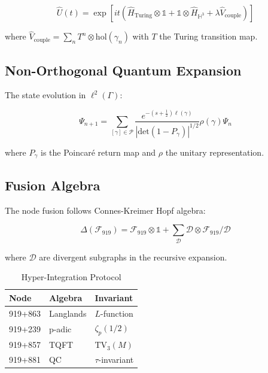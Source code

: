 \documentclass[12pt]{article}
\begin{document}
\begin{equation}
\hat{U}(t) = \exp\left[it\left(\hat{H}_{\text{Turing}} \otimes \mathbb{1} + \mathbb{1} \otimes \hat{H}_{\mathbb{H}^3} + \lambda \hat{V}_{\text{couple}}\right)\right]
\end{equation}

where $\hat{V}_{\text{couple}} = \sum_n T^n \otimes \text{hol}(\gamma_n)$ with $T$ the Turing transition map.

\subsection{Non-Orthogonal Quantum Expansion}
The state evolution in $\ell^2(\Gamma)$:

\begin{equation}
\Psi_{n+1} = \sum_{[\gamma]\in\mathcal{P}} \frac{e^{-(s+\frac{1}{2})\ell(\gamma)}}{|\text{det}(1-P_\gamma)|^{1/2}} \rho(\gamma)\Psi_n
\end{equation}

where $P_\gamma$ is the Poincaré return map and $\rho$ the unitary representation.

\begin{algorithm}[H]
\caption{Recursive Entropy Modulation}
\begin{algorithmic}[1]
\STATE Initialize $\Psi_0$ with $S_0 = \log\dim\mathcal{H}_\Gamma$
$}
\STATE Compute $\Delta S_n = \| \text{tr}_{\partial\mathbb{H}^3}(\Psi_n^\dagger\Psi_n) \|_1$
\STATE Update $S_{n+1} = S_n e^{-\alpha t} + \beta \Delta S_n$
\STATE Apply $U_{\text{Hopf}}(t) = \exp\left[it \int_{S^1} \eta^*\nabla \right]$
\ENDFOR
\end{algorithmic}
\end{algorithm}

\subsection{Fusion Algebra}
The node fusion follows Connes-Kreimer Hopf algebra:

\begin{equation}
\Delta(\mathcal{F}_{919}) = \mathcal{F}_{919} \otimes \mathbb{1} + \sum_{\mathcal{D}} \mathcal{D} \otimes \mathcal{F}_{919}/\mathcal{D}
\end{equation}

where $\mathcal{D}$ are divergent subgraphs in the recursive expansion.

\begin{table}[H]
\centering
\caption{Hyper-Integration Protocol}
\begin{tabular}{lll}
\textbf{Node} & \textbf{Algebra} & \textbf{Invariant} \\
\hline
919+863 & Langlands & $L$-function \\
919+239 & p-adic & $\zeta_p(1/2)$ \\
919+857 & TQFT & $\text{TV}_3(M)$ \\
919+881 & QC & $\tau$-invariant \\
\end{tabular}
\end{table}
\end{document}
